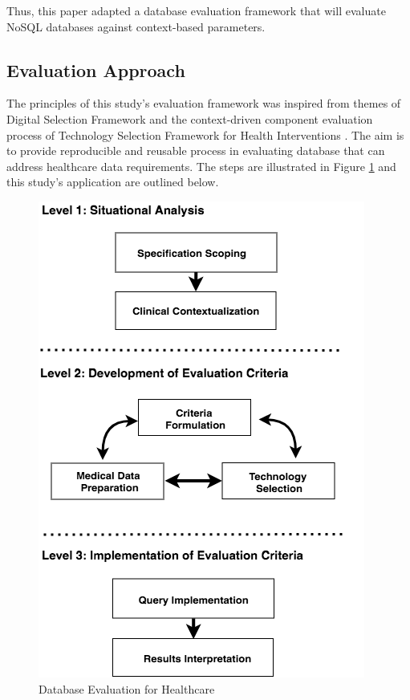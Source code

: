 \documentclass[5p]{elsarticle}
\begin{document}
Thus, this paper adapted a database evaluation framework that will evaluate NoSQL databases against context-based parameters. 

\subsection{Evaluation Approach}
The principles of this study's evaluation framework was inspired from themes of Digital Selection Framework \cite{A.Ostrovsky20141} 
and the context-driven component evaluation process of Technology Selection Framework for Health Interventions \cite{C.Chan2010300}. 
The aim is to provide reproducible and reusable process in evaluating database that can address healthcare data requirements.
The steps are illustrated in Figure \ref{fig.framework} and this study's application are outlined below. 

\begin{figure}[ht]
    \centering
    \includegraphics[scale=0.5] {SeDB6}
    \caption{Database Evaluation for Healthcare}\label{fig.framework}
\end{figure}
\end{document}

